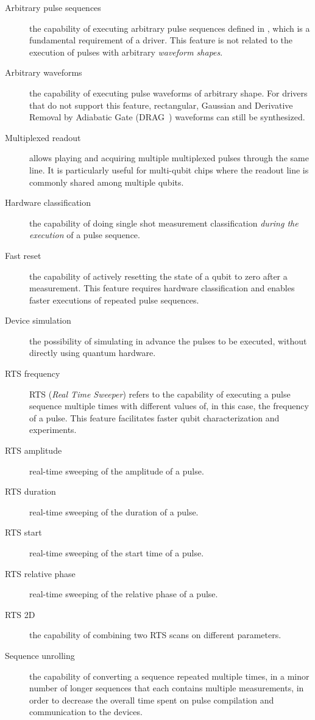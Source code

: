 \begin{description}
    \item[Arbitrary pulse sequences] the capability of executing arbitrary pulse sequences defined in \Qibolab, which is a fundamental requirement of a driver. This feature is not related to the execution of pulses with arbitrary \textit{waveform shapes}.
    \item[Arbitrary waveforms] the capability of executing pulse waveforms of arbitrary shape. For drivers that do not support this feature, rectangular, Gaussian and Derivative Removal by Adiabatic Gate (DRAG~\cite{Gambetta2011}) waveforms can still be synthesized.
    \item[Multiplexed readout] allows playing and acquiring multiple multiplexed pulses through the same line. It is particularly useful for multi-qubit chips where the readout line is commonly shared among multiple qubits.
    \item[Hardware classification] the capability of doing single shot measurement classification \textit{during the execution} of a pulse sequence.
    \item[Fast reset] the capability of actively resetting the state of a qubit to zero after a measurement. This feature requires hardware classification and enables faster executions of repeated pulse sequences.
    \item[Device simulation] the possibility of simulating in advance the pulses to be executed, without directly using quantum hardware.
    \item[RTS frequency] RTS (\textit{Real Time Sweeper}) refers to the capability of executing a pulse sequence multiple times with different values of, in this case, the frequency of a pulse. This feature facilitates faster qubit characterization and experiments.
    \item[RTS amplitude] real-time sweeping of the amplitude of a pulse.
    \item[RTS duration] real-time sweeping of the duration of a pulse.
    \item[RTS start] real-time sweeping of the start time of a pulse.
    \item[RTS relative phase] real-time sweeping of the relative phase of a pulse.
    \item[RTS 2D] the capability of combining two RTS scans on different parameters.
    \item[Sequence unrolling] the capability of converting a sequence repeated multiple times, in a minor number of longer sequences that each contains multiple measurements, in order to decrease the overall time spent on pulse compilation and communication to the devices.

\end{description}
